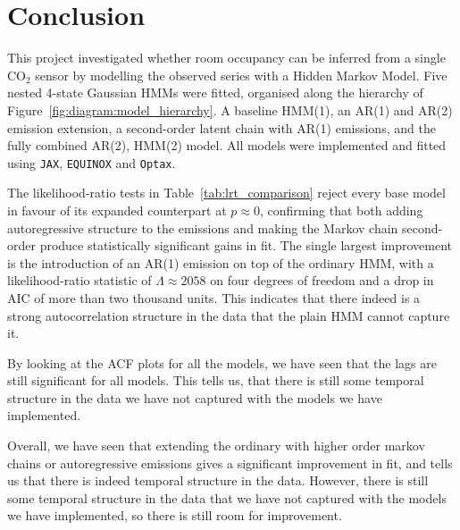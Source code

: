 \section{Conclusion}

This project investigated whether room occupancy can be inferred from a single
$\text{CO}_2$ sensor by modelling the observed series with a Hidden Markov
Model. Five nested 4-state Gaussian HMMs were fitted, organised along the
hierarchy of Figure~\ref{fig:diagram:model_hierarchy}. A
baseline HMM(1), an
AR(1) and AR(2) emission extension, a second-order latent chain with AR(1)
emissions, and the fully combined AR(2), HMM(2) model. All models were
implemented and fitted using \texttt{JAX}, \texttt{EQUINOX} and \texttt{Optax}.

The likelihood-ratio tests in
Table~\ref{tab:lrt_comparison} reject every base model in favour of its
expanded counterpart at $p \approx 0$, confirming that both adding
autoregressive structure to the emissions and making the Markov
chain second-order produce statistically significant gains in fit.
The single largest
improvement is the introduction of an AR(1) emission on top of the ordinary
HMM, with a likelihood-ratio statistic of $\Lambda \approx 2058$ on four
degrees of freedom and a drop in AIC of more than two thousand units. This
indicates that there indeed is a strong autocorrelation structure in the data that the plain HMM cannot
capture it. 

By looking at the ACF plots for all the models, we have seen
that the lags are still significant for all models. This tells us, 
that there is still some temporal structure in the data we have not captured with the 
models we have implemented.

Overall, we have seen that extending the ordinary with 
higher order markov chains or autoregressive emissions gives a significant improvement in fit, 
and tells us that there is indeed temporal structure in the data. However, there is still some temporal structure in the data that we have not captured with the models we have implemented, so there is still room for improvement.